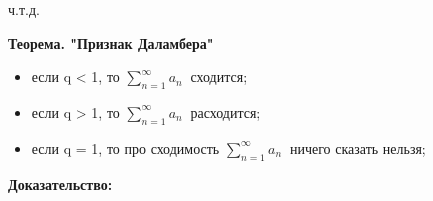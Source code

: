 \documentclass[book, 11pt]{report}
\begin{document}
        \par{{\raggedleft ч.т.д.\par}}
        \newpage
        \par{\textbf{Теорема. "Признак Даламбера"}\\
        }
        \begin{itemize}
            \item \par{если q < 1, то $\displaystyle\sum_{n=1}^{\infty}a_n\ $ сходится;}
            \item \par{если q > 1, то $\displaystyle\sum_{n=1}^{\infty}a_n\ $ расходится;}
            \item \par{если q = 1, то про сходимость $\displaystyle\sum_{n=1}^{\infty}a_n\ $ ничего сказать нельзя;}
        \end{itemize}
        \textbf{Доказательство:}
\end{document}
